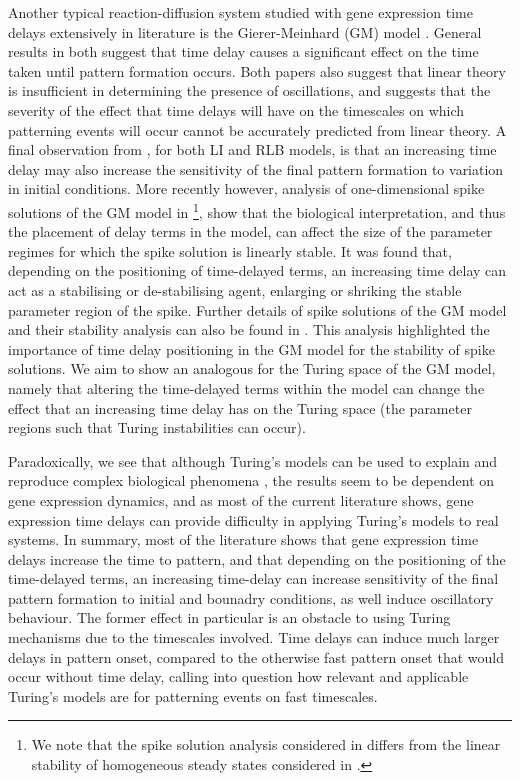 Another typical reaction-diffusion system studied with gene expression time delays extensively in literature is the Gierer-Meinhard (GM) model \cite{gm}. General results in both \cite{leegaffney,leegaffmonk} suggest that time delay causes a significant effect on the time taken until pattern formation occurs. Both papers also suggest that linear theory is insufficient in determining the presence of oscillations, and \cite{leegaffmonk} suggests that the severity of the effect that time delays will have on the timescales on which patterning events will occur cannot be accurately predicted from linear theory. A final observation from \cite{gaffmonk,leegaffmonk}, for both LI and RLB models, is that an increasing time delay may also increase the sensitivity of the final pattern formation to variation in initial conditions. More recently however, analysis of one-dimensional spike solutions of the GM model in \cite{fadai1,fadai2}\footnote{We note that the spike solution analysis considered in \cite{fadai1,fadai2} differs from the linear stability of homogeneous steady states considered in \cite{leegaffmonk,gaffmonk,leegaffney}.}, show that the biological interpretation, and thus the placement of delay terms in the model, can affect the size of the parameter regimes for which the spike solution is linearly stable. It was found that, depending on the positioning of time-delayed terms, an increasing time delay can act as a stabilising or de-stabilising agent, enlarging or shriking the stable parameter region of the spike. Further details of spike solutions of the GM model and their stability analysis can also be found in \cite{spike}. This analysis highlighted the importance of time delay positioning in the GM model for the stability of spike solutions. We aim to show an analogous for the Turing space of the GM model, namely that altering the time-delayed terms within the model can change the effect that an increasing time delay has on the Turing space (the parameter regions such that Turing instabilities can occur).

Paradoxically, we see that although Turing's models can be used to explain and reproduce complex biological phenomena \cite{leegaffney}, the results seem to be dependent on gene expression dynamics, and as most of the current literature shows, gene expression time delays can provide difficulty in applying Turing's models to real systems. In summary, most of the literature shows that gene expression time delays increase the time to pattern, and that depending on the positioning of the time-delayed terms, an increasing time-delay can increase sensitivity of the final pattern formation to initial and bounadry conditions, as well induce oscillatory behaviour. The former effect in particular is an obstacle to using Turing mechanisms due to the timescales involved. Time delays can induce much larger delays in pattern onset, compared to the otherwise fast pattern onset that would occur without time delay, calling into question how relevant and applicable Turing's models are for patterning events on fast timescales.

